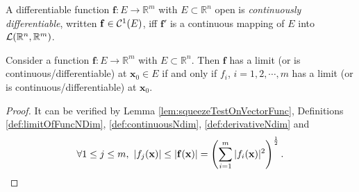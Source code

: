 \begin{defn}
  \label{def:C1VecFunc}
  A differentiable function $\mathbf{f}: E\rightarrow \mathbb{R}^m$
  with $E\subset \mathbb{R}^n$ open
  is \emph{continuously differentiable},
  written $\mathbf{f}\in{\cal C}^1(E)$, 
  iff $\mathbf{f}'$ is a continuous mapping of $E$
  into ${\cal L}(\mathbb{R}^n,\mathbb{R}^m)$.
\end{defn}

\begin{lem}
  \label{lem:FuncEquvItsComponent}
  Consider a function $\mathbf{f}:E\rightarrow \mathbb{R}^{m}$ with
  $E\subset \mathbb{R}^{n}$. Then $\mathbf{f}$ has a limit 
  (or is continuous/differentiable) at $\mathbf{x}_{0}\in E$
  if and only if
  $f_{i}$, $i=1,2,\cdots,m$ has a limit (or is continuous/differentiable)
  at $\mathbf{x}_{0}$.
\end{lem}
\begin{proof}
  It can be verified by Lemma \ref{lem:squeezeTestOnVectorFunc},
  Definitions \ref{def:limitOfFuncNDim},
  \ref{def:continuousNdim}, \ref{def:derivativeNdim} and
  \begin{displaymath}
    \forall 1\le j\le m,\
    |f_{j}(\mathbf{x})|\le|\mathbf{f}(\mathbf{x})|
    =\left(\sum_{i=1}^{m}|f_{i}(\mathbf{x})|^{2}\right)^{\frac{1}{2}}
    .\qedhere
  \end{displaymath}
\end{proof}

